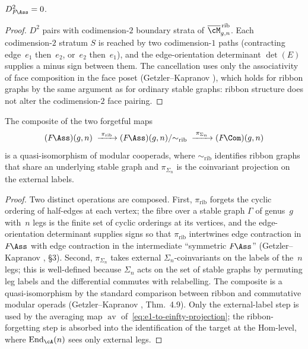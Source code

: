 \begin{theorem}[\ClaimStatusProvedHere]
\label{thm:fass-d-squared-zero}
$D_{F\!\Ass}^2 = 0$.
\end{theorem}

\begin{proof}
$D^2$ pairs with codimension-$2$ boundary strata of
$\overline{\cM}_{g,n}^{\,\mathrm{rib}}$. Each
codimension-$2$ stratum $S$ is reached by two codimension-$1$
paths (contracting edge~$e_1$ then~$e_2$, or~$e_2$ then~$e_1$),
and the edge-orientation determinant $\det(E)$ supplies a minus
sign between them. The cancellation uses only the associativity
of face composition in the face poset
(Getzler--Kapranov \cite{GK98}), which holds for ribbon graphs
by the same argument as for ordinary stable graphs: ribbon
structure does not alter the codimension-$2$ face pairing.
\end{proof}

\begin{theorem}[\ClaimStatusProvedHere]
\label{thm:fcom-coinvariant-fass}
The composite of the two forgetful maps
\begin{equation}
\label{eq:fass-to-fcom-composite}
(F\!\Ass)(g,n)
\;\xrightarrow{\;\pi_{\mathrm{rib}}\;}
(F\!\Ass)(g,n) / {\sim_{\mathrm{rib}}}
\;\xrightarrow{\;\pi_{\Sigma_n}\;}
(F\!\Com)(g,n)
\end{equation}
is a quasi-isomorphism of modular cooperads, where
$\sim_{\mathrm{rib}}$ identifies ribbon graphs that share an
underlying stable graph and $\pi_{\Sigma_n}$ is the coinvariant
projection on the external labels.
\end{theorem}

\begin{proof}
Two distinct operations are composed. First, $\pi_{\mathrm{rib}}$
forgets the cyclic ordering of half-edges at each vertex; the fibre
over a stable graph $\Gamma$ of genus~$g$ with~$n$ legs is the finite
set of cyclic orderings at its vertices, and the edge-orientation
determinant supplies signs so that $\pi_{\mathrm{rib}}$ intertwines
edge contraction in $F\!\Ass$ with edge contraction in the
intermediate ``symmetric $F\!\Ass$''
(Getzler--Kapranov \cite{GK98}, \S3).
Second, $\pi_{\Sigma_n}$ takes external $\Sigma_n$-coinvariants on
the labels of the~$n$ legs; this is well-defined because
$\Sigma_n$ acts on the set of stable graphs by permuting leg labels
and the differential commutes with relabelling. The composite is a
quasi-isomorphism by the standard comparison between ribbon and
commutative modular operads (Getzler--Kapranov \cite{GK98}, Thm.~4.9).
Only the external-label step is used by the averaging map
$\operatorname{av}$ of~\eqref{eq:e1-to-einfty-projection}; the
ribbon-forgetting step is absorbed into the identification of the
target at the Hom-level, where $\operatorname{End}_\cA(n)$ sees only
external legs.
\end{proof}

